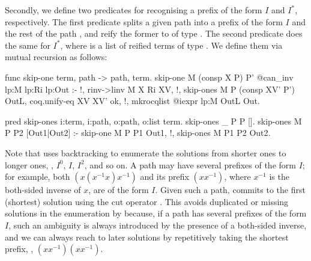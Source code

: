 \documentclass[a4paper,UKenglish,cleveref,autoref]{lipics-v2021}
\newcommand{\Rocq}{{\sffamily\scshape Rocq}\xspace}
\newcommand{\Elpi}{{\sffamily\scshape Elpi}\xspace}
\begin{document}
Secondly, we define two predicates for recognising a prefix of the form $I$ and $I^*$, respectively.
The first predicate  splits a given path  into a prefix of the
form $I$ and the rest of the path , and reify the former to  of type
.
The second predicate  does the same for $I^*$, where  is a list
of reified terms of type .
We define them via mutual recursion as follows:
\begin{elpicode}
func skip-one term, path -> path, term.
skip-one M (consp X P) P' {{ @can_inv lp:M lp:Ri lp:Out }} :- !,
  rinv->linv M X Ri XV, !,              %
  skip-ones M P (consp XV' P') OutL,    %
  coq.unify-eq XV XV' ok,               %
  !, %
  mkrocqlist {{ @iexpr lp:M }} OutL Out.%

pred skip-ones i:term, i:path, o:path, o:list term.
skip-ones _ P P [].
skip-ones M P P2 [Out1|Out2] :- skip-one M P P1 Out1, !, skip-ones M P1 P2 Out2.
\end{elpicode}
Note that  uses backtracking to enumerate the solutions from shorter ones to longer
ones, \ie, $I^0$, $I$, $I^2$, and so on.
A path may have several prefixes of the form $I$; for example, both $(x (x^{-1} x) x^{-1})$ and its
prefix $(x x^{-1})$, where $x^{-1}$ is the both-sided inverse of $x$, are of the form $I$.
Given such a path,  commits to the first (shortest) solution using the cut operator
\elpi{!}.
This avoids duplicated or missing solutions in the enumeration by  because, if a
path has several prefixes of the form $I$, such an ambiguity is always introduced by the presence of
a both-sided inverse, and we can always reach to later solutions by repetitively taking the shortest
prefix, \eg, $(x x^{-1}) (x x^{-1})$.
\end{document}
